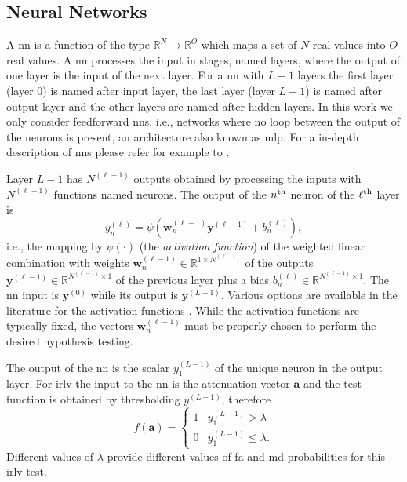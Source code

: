 \documentclass[draftcls,onecolumn,12pt]{IEEEtran}
\begin{document}
\subsection{Neural Networks}\label{sec:nn}

A \ac{nn} is a function of the type $\mathbb{R}^N \to \mathbb{R}^O$ which maps a set of $N$ real values into $O$ real values. A \ac{nn} processes the input in stages, named layers, where the output of one layer is the input of the next layer. For a \ac{nn} with $L-1$ layers the first layer (layer $0$) is named after input layer, the last layer (layer $L-1$) is named after output layer and the other layers are named after hidden layers. In this work we only consider feedforward \acp{nn}, i.e., networks where no loop between the output of the neurons is present, an architecture  also known as \ac{mlp}. For a in-depth description of \acp{nn} please refer for example to \cite{goodfellow}.

Layer $L-1$ has $N^{(\ell-1)}$ outputs obtained by processing the inputs with $N^{(\ell-1)}$ functions named neurons. The output of the $n^{\rm th}$ neuron of the $\ell^{\rm th}$ layer is
\begin{equation}\label{eq:nonLin}
y_n^{(\ell)} = \psi\left( \bm{w}_n^{(\ell -1)}\bm{y}^{(\ell-1)}+b_n^{(\ell)} \right),
\end{equation}
i.e., the mapping by $\psi(\cdot)$ (the {\em activation function}) of the weighted linear combination with weights $\bm{w}_n^{(\ell -1)}\in \mathbb{R}^{1\times N^{(\ell-1)}}$ of the outputs $\bm{y}^{(\ell-1)} \in \mathbb{R}^{N^{(\ell-1)} \times 1 }$ of the previous layer plus a bias $b_n^{(\ell)} \in \mathbb{R}^{N^{(\ell-1)} \times 1 }$. The \ac{nn} input is $\bm{y}^{(0)}$ while its output is $\bm{y}^{(L-1)}$. Various options are available in the literature for the activation functions \cite{goodfellow}. While the activation functions are typically fixed, the vectors $\bm{w}_n^{(\ell -1)}$ must be properly chosen to perform the desired hypothesis testing. 

The output of the \ac{nn} is the scalar $y^{(L-1)}_1$ of the unique neuron in the output layer. For \ac{irlv} the input to the \ac{nn} is the attenuation vector $\bm{a}$ and the  test function is obtained by thresholding $y^{(L-1)}$, therefore
\begin{equation}
    f(\bm{a}) = \begin{cases}
    1 & y^{(L-1)}_1 > \lambda \\
    0 & y^{(L-1)}_1 \leq \lambda.
    \end{cases}
\end{equation}
Different values of $\lambda$ provide different values of \ac{fa} and \ac{md} probabilities for this \ac{irlv} test.
   
\end{document}
